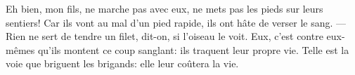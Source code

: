Eh bien, mon fils, ne marche pas avec eux,
	ne mets pas les pieds sur leurs sentiers!
Car ils vont au mal d’un pied rapide, ils ont hâte de verser le sang.
	--- Rien ne sert de tendre un filet, dit-on, si l’oiseau le voit.
Eux, c’est contre eux-mêmes qu’ils montent ce coup sanglant:
	ils traquent leur propre vie.
Telle est la voie que briguent les brigands:
	elle leur coûtera la vie.

